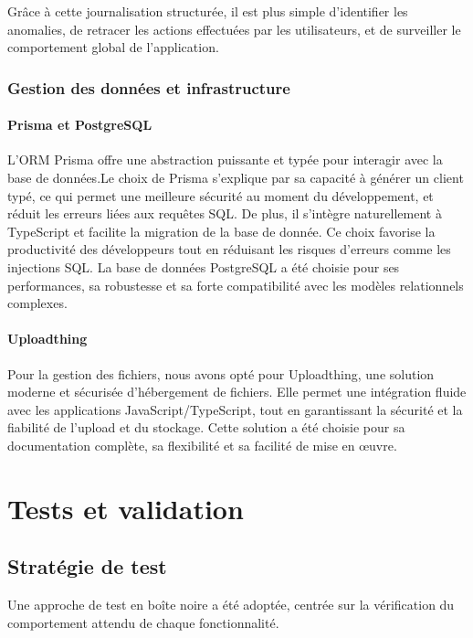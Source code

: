 Grâce à cette journalisation structurée, il est plus simple d’identifier les anomalies, de retracer les actions effectuées par les utilisateurs, et de surveiller le comportement global de l’application.

\subsubsection{Gestion des données et infrastructure}

\paragraph{Prisma et PostgreSQL}

L’ORM Prisma offre une abstraction puissante et typée pour interagir avec la base de données.Le choix de Prisma s’explique par sa capacité à générer un client typé, ce qui permet une meilleure sécurité au moment du développement, et réduit les erreurs liées aux requêtes SQL. De plus, il s’intègre naturellement à TypeScript et facilite la migration de la base de donnée. Ce choix favorise la productivité des développeurs tout en réduisant les risques d'erreurs comme les injections SQL. La base de données PostgreSQL a été choisie pour ses performances, sa robustesse et sa forte compatibilité avec les modèles relationnels complexes.

\paragraph{Uploadthing}

Pour la gestion des fichiers, nous avons opté pour Uploadthing, une solution moderne et sécurisée d’hébergement de fichiers. Elle permet une intégration fluide avec les applications JavaScript/TypeScript, tout en garantissant la sécurité et la fiabilité de l’upload et du stockage. Cette solution a été choisie pour sa documentation complète, sa flexibilité et sa facilité de mise en œuvre.

\section{Tests et validation}
\subsection{Stratégie de test}
Une approche de test en boîte noire a été adoptée, centrée sur la vérification du comportement attendu de chaque fonctionnalité.

